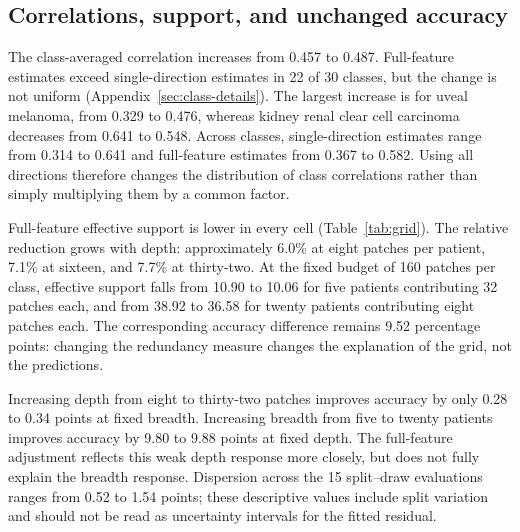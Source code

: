 \subsection{Correlations, support, and unchanged accuracy}
The class-averaged correlation increases from 0.457 to 0.487. Full-feature estimates exceed single-direction estimates in 22 of 30 classes, but the change is not uniform (Appendix~\ref{sec:class-details}). The largest increase is for uveal melanoma, from 0.329 to 0.476, whereas kidney renal clear cell carcinoma decreases from 0.641 to 0.548. Across classes, single-direction estimates range from 0.314 to 0.641 and full-feature estimates from 0.367 to 0.582. Using all directions therefore changes the distribution of class correlations rather than simply multiplying them by a common factor.

\begin{table}[htbp]
\centering
\small

\caption{The nine allocations retain identical accuracies under both redundancy measures. $G$ is patients per class and $m$ is patches per patient. Accuracy is patient-macro balanced accuracy in percent, with test-patient 95\% intervals. SD is the population standard deviation across all 15 split--draw accuracies, in percentage points. Effective support is averaged over classes and expressed per class.}
\label{tab:grid}
\end{table}

\noindent Full-feature effective support is lower in every cell (Table~\ref{tab:grid}). The relative reduction grows with depth: approximately 6.0\% at eight patches per patient, 7.1\% at sixteen, and 7.7\% at thirty-two. At the fixed budget of 160 patches per class, effective support falls from 10.90 to 10.06 for five patients contributing 32 patches each, and from 38.92 to 36.58 for twenty patients contributing eight patches each. The corresponding accuracy difference remains 9.52 percentage points: changing the redundancy measure changes the explanation of the grid, not the predictions.

Increasing depth from eight to thirty-two patches improves accuracy by only 0.28 to 0.34 points at fixed breadth. Increasing breadth from five to twenty patients improves accuracy by 9.80 to 9.88 points at fixed depth. The full-feature adjustment reflects this weak depth response more closely, but does not fully explain the breadth response. Dispersion across the 15 split--draw evaluations ranges from 0.52 to 1.54 points; these descriptive values include split variation and should not be read as uncertainty intervals for the fitted residual.

